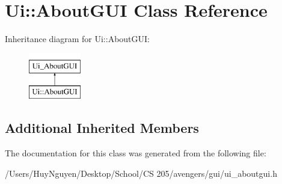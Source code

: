 \hypertarget{classUi_1_1AboutGUI}{}\section{Ui\+:\+:About\+G\+UI Class Reference}
\label{classUi_1_1AboutGUI}
Inheritance diagram for Ui\+:\+:About\+G\+UI\+:\begin{figure}[H]
\begin{center}
\leavevmode
\includegraphics[height=2.000000cm]{classUi_1_1AboutGUI}
\end{center}
\end{figure}
\subsection*{Additional Inherited Members}


The documentation for this class was generated from the following file\+:\begin{DoxyCompactItemize}
\item 
/\+Users/\+Huy\+Nguyen/\+Desktop/\+School/\+C\+S 205/avengers/gui/ui\+\_\+aboutgui.\+h\end{DoxyCompactItemize}
